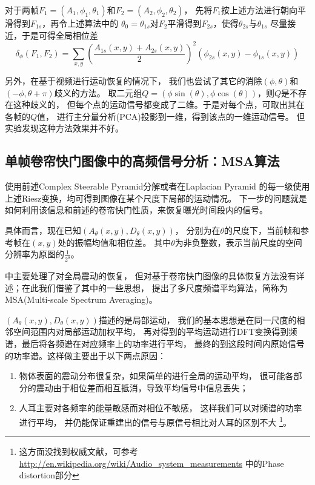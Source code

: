 对于两帧$F_1 = (A_1, \phi_1, \theta_1)$和$F_2 = (A_2, \phi_2, \theta_2)$，
先将$F_1$按上述方法进行朝向平滑得到$F_{1s}$，再令上述算法中的
$\theta_0=\theta_{1s}$对$F_2$平滑得到$F_{2s}$，使得$\theta_{2s}$与$\theta_{1s}$
尽量接近，于是可得全局相位差
\begin{equation}
    \delta_\phi(F_1, F_2) = \sum_{x, y}
    \left(\frac{A_{1s}(x, y) + A_{2s}(x, y)}{2}\right)^2(\phi_{2s}(x, y) -
    \phi_{1s}(x, y))
    \label{eqn:global-phasediff}
\end{equation}

另外，在基于视频进行运动恢复的情况下，
我们也尝试了其它的消除$(\phi, \theta)$和$(-\phi, \theta+\pi)$歧义的方法。
取二元组$Q=(\phi\sin(\theta), \phi\cos(\theta))$，则$Q$是不存在这种歧义的，
但每个点的运动信号都变成了二维。于是对每个点，可取出其在各帧的$Q$值，
进行主分量分析(PCA)投影到一维，得到该点的一维运动信号。
但实验发现这种方法效果并不好。


\subsection{单帧卷帘快门图像中的高频信号分析：MSA算法\label{sec:algo-hf}}
使用前述Complex Steerable Pyramid分解或者在Laplacian Pyramid
的每一级使用上述Riesz变换，均可得到图像在某个尺度下局部的运动情况。
下一步的问题就是如何利用该信息和前述的卷帘快门性质，来恢复曝光时间段内的信号。

具体而言，现在已知$(A_\theta(x, y), D_\theta(x, y))$，
分别为在$\theta$的尺度下，当前帧和参考帧在$(x, y)$处的振幅均值和相位差。
其中$\theta$为非负整数，表示当前尺度的空间分辨率为原图的$\frac{1}{2^\theta}$。

\cite{Davis2014VisualMic}中主要处理了对全局震动的恢复，
但对基于卷帘快门图像的具体恢复方法没有详述；在此我们借鉴了其中的一些思想，
提出了多尺度频谱平均算法，简称为MSA(Multi-scale Spectrum Averaging)。

$(A_\theta(x, y), D_\theta(x, y))$描述的是局部运动，
我们的基本思想是在同一尺度的相邻空间范围内对局部运动加权平均，
再对得到的平均运动进行DFT变换得到频谱，最后将各频谱在对应频率上的功率进行平均，
最终的到这段时间内原始信号的功率谱。这样做主要出于以下两点原因：
\begin{enumerate}
    \item 物体表面的震动分布很复杂，如果简单的进行全局的运动平均，
        很可能各部分的震动由于相位差而相互抵消，导致平均信号中信息丢失；
    \item 人耳主要对各频率的能量敏感而对相位不敏感，
        这样我们可以对频谱的功率进行平均，
        并仍能保证重建出的信号与原信号相比对人耳的区别不大
        \footnote{这方面没找到权威文献，可参考
            \url{http://en.wikipedia.org/wiki/Audio\_system\_measurements}
        中的Phase distortion部分}。
\end{enumerate}

